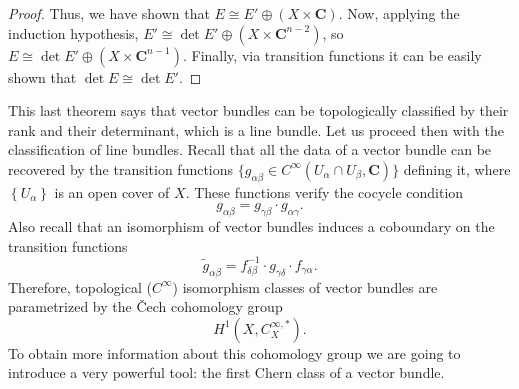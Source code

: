 \documentclass[12pt,a4paper]{book}
\theoremstyle{definition} \newtheorem{defn}[thm]{Definition}
\theoremstyle{definition} \newtheorem{ejemplo}[thm]{Example}
\theoremstyle{remark} \newtheorem{rem}[thm]{Remark}
\def\CC{\mathbf{C}}
\begin{document}
\begin{proof}
     Thus, we have shown that $E\cong E'\oplus (X\times \CC)$. Now, applying the induction hypothesis, $E'\cong \det E' \oplus (X\times \CC^{n-2})$, so $E\cong \det E' \oplus (X\times \CC^{n-1})$. Finally, via transition functions it can be easily shown that $\det E \cong \det E'$.
\end{proof}

This last theorem says that vector bundles can be topologically classified by their rank and their determinant, which is a line bundle. Let us proceed then with the classification of line bundles. Recall that all the data of a vector bundle can be recovered by the transition functions $\{g_{\alpha \beta}\in C^\infty(U_\alpha \cap U_\beta , \CC)\}$ defining it, where $\left\{ U_\alpha \right\}$ is an open cover of $X$. These functions verify the cocycle condition $$g_{\alpha \beta}=g_{\gamma \beta}\cdot g_{\alpha \gamma}.$$ Also recall that an isomorphism of vector bundles induces a coboundary on the transition functions
\begin{equation*}
  \tilde{g}_{\alpha\beta}=f^{-1}_{\delta\beta}\cdot g_{\gamma\delta} \cdot f_{\gamma\alpha}.
\end{equation*}
Therefore, topological ($C^\infty$) isomorphism classes of vector bundles are parametrized by the \v{C}ech cohomology group
\begin{equation*}
  H^1(X,C^{\infty,*}_X).
\end{equation*}
To obtain more information about this cohomology group we are going to introduce a very powerful tool: the first Chern class of a vector bundle.
\end{document}
